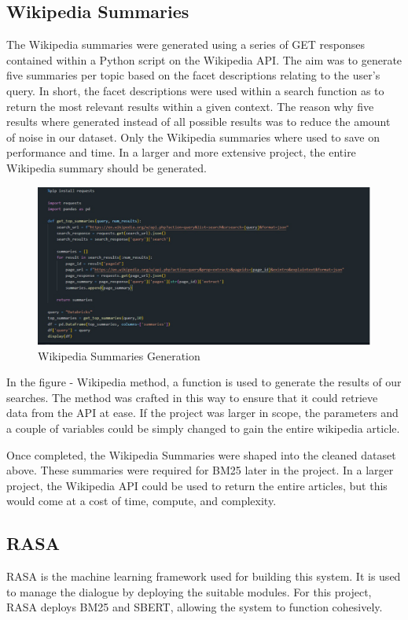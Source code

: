 \documentclass[11pt]{article}
\begin{document}
\subsection{Wikipedia Summaries}
The Wikipedia summaries were generated using a series of GET responses contained within a Python script on the Wikipedia API. The aim was to generate five summaries per topic based on the facet descriptions \textendash{} relating to the user's query. In short, the facet descriptions were used within a search function as to return the most relevant results within a given context. The reason why five results where generated instead of all possible results was to reduce the amount of noise in our dataset. Only the Wikipedia summaries where used to save on performance and time. In a larger and more extensive project, the entire Wikipedia summary should be generated. 

\begin{figure}[htbp]
  \centering
  \includegraphics[width=\linewidth]{./img/wiki.png}
  \caption{Wikipedia Summaries Generation}
  \label{fig:wikipedia method}
\end{figure}

In the figure - Wikipedia method, a function is used to generate the results of our searches. The method was crafted in this way to ensure that it could retrieve data from the API at ease. If the project was larger in scope, the parameters and a couple of variables could be simply changed to gain the entire wikipedia article. 

Once completed, the Wikipedia Summaries were shaped into the cleaned dataset above. These summaries were required for BM25 later in the project. In a larger project, the Wikipedia API could be used to return the entire articles, but this would come at a cost of time, compute, and complexity.


\subsection{{RASA}}
RASA is the machine learning framework used for building this system. It is used to manage the dialogue by deploying the suitable modules. For this project, RASA deploys BM25 and SBERT, allowing the system to function cohesively. 
\end{document}
